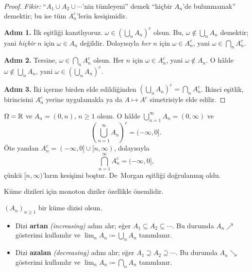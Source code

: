 \begin{proof}
\textit{Fikir:} ``$A_1 \cup A_2 \cup \cdots$'nin tümleyeni'' demek ``hiçbir $A_n$'de
bulunmamak'' demektir; bu ise tüm $A_n^c$'lerin kesişimidir.

\medskip

\textbf{Adım 1.} İlk eşitliği kanıtlıyoruz. $\omega \in \left(\bigcup_n A_n\right)^c$
olsun. Bu, $\omega \notin \bigcup_n A_n$ demektir; yani \emph{hiçbir} $n$ için
$\omega \in A_n$ değildir. Dolayısıyla \emph{her} $n$ için $\omega \in A_n^c$,
yani $\omega \in \bigcap_n A_n^c$.

\textbf{Adım 2.} Tersine, $\omega \in \bigcap_n A_n^c$ olsun. Her $n$ için
$\omega \in A_n^c$, yani $\omega \notin A_n$. O hâlde $\omega \notin \bigcup_n A_n$,
yani $\omega \in \left(\bigcup_n A_n\right)^c$.

\medskip

\textbf{Adım 3.} İki içerme birden elde edildiğinden
$\left(\bigcup_n A_n\right)^c = \bigcap_n A_n^c$.
İkinci eşitlik, birincisini $A_n^c$ yerine uygulamakla ya da
$A \mapsto A^c$ simetrisiyle elde edilir.
\end{proof}

\begin{ornek}\label{ex:demorgan}
$\Omega = \mathbb{R}$ ve $A_n = (0, n)$, $n \geq 1$ olsun.
O hâlde $\bigcup_{n=1}^\infty A_n = (0,\infty)$ ve
\[
  \left(\bigcup_{n=1}^\infty A_n\right)^c = (-\infty,0].
\]
Öte yandan $A_n^c = (-\infty,0] \cup [n,\infty)$, dolayısıyla
\[
  \bigcap_{n=1}^\infty A_n^c = (-\infty,0],
\]
çünkü $[n,\infty)$'ların kesişimi boştur. De~Morgan eşitliği doğrulanmış oldu.
\end{ornek}

Küme dizileri için monoton diziler özellikle önemlidir.

\begin{tanim}\label{def:monotondizi}
$(A_n)_{n \geq 1}$ bir küme dizisi olsun.
\begin{itemize}
  \item Dizi \textbf{artan} \emph{(increasing)} adını alır; eğer $A_1 \subseteq A_2 \subseteq \cdots$.
        Bu durumda $A_n \nearrow$ gösterimi kullanılır ve
        $\lim_n A_n \coloneqq \bigcup_n A_n$ tanımlanır.
  \item Dizi \textbf{azalan} \emph{(decreasing)} adını alır; eğer $A_1 \supseteq A_2 \supseteq \cdots$.
        Bu durumda $A_n \searrow$ gösterimi kullanılır ve
        $\lim_n A_n \coloneqq \bigcap_n A_n$ tanımlanır.
\end{itemize}
\end{tanim}

